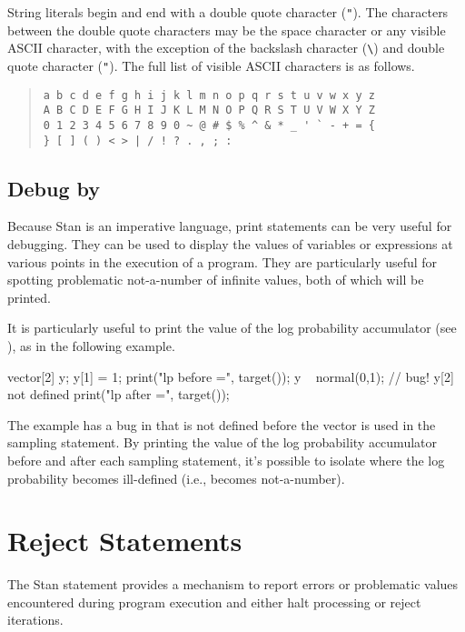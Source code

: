 String literals begin and end with a double quote character
(\Verb|"|).  The characters between the double quote characters may be
the space character or any visible ASCII character, with the exception
of the backslash character (\Verb|\|) and double quote character
(\Verb|"|).  The full list of visible ASCII characters is as follows.
%
\begin{quote}
\begin{Verbatim}
a b c d e f g h i j k l m n o p q r s t u v w x y z
A B C D E F G H I J K L M N O P Q R S T U V W X Y Z
0 1 2 3 4 5 6 7 8 9 0 ~ @ # $ % ^ & * _ ' ` - + = {
} [ ] ( ) < > | / ! ? . , ; :
\end{Verbatim}
\end{quote}

\subsection{Debug by }

Because Stan is an imperative language, print statements can be very
useful for debugging.  They can be used to display the values of
variables or expressions at various points in the execution of a
program.  They are particularly useful for spotting problematic
not-a-number of infinite values, both of which will be printed.

It is particularly useful to print the value of the log probability
accumulator (see ), as in the following example.
%
\begin{stancode}
vector[2] y;
y[1] = 1;
print("lp before =", target());
y ~ normal(0,1);  // bug!  y[2] not defined
print("lp after =", target());
\end{stancode}
%
The example has a bug in that  is not defined before the
vector  is used in the sampling statement.  By printing the
value of the log probability accumulator before and after each
sampling statement, it's possible to isolate where the log probability
becomes ill-defined (i.e., becomes not-a-number).

\section{Reject Statements}\label{reject-statements.section}

The Stan  statement provides a mechanism to
report errors or problematic values encountered during program
execution and either halt processing or reject iterations.

